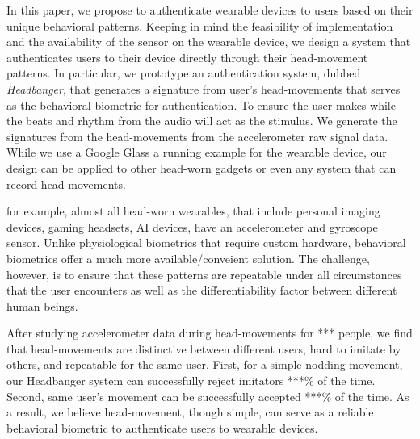 \vspace{1mm}
In this paper, we propose to authenticate wearable devices to users based on 
their unique behavioral patterns. Keeping in mind the feasibility of 
implementation and the availability of the sensor on the wearable device, 
we design a system that authenticates users to their device directly through 
their head-movement patterns.
In particular, we prototype an authentication system, dubbed {\em Headbanger},
that generates a signature from user's head-movements that serves as the 
behavioral biometric for authentication. To ensure the user makes while the 
beats and 
rhythm from the 
audio will 
act as the
stimulus. We generate the signatures from the head-movements from the
accelerometer raw signal data. While we use a Google Glass a running example
for the wearable device, our design can be applied to other head-worn gadgets
or even any system that can record head-movements.

for example, almost all head-worn wearables, that include personal imaging 
devices, gaming headsets, AI devices, have an accelerometer and gyroscope
sensor. Unlike physiological biometrics that require custom hardware,
behavioral biometrics offer a much more available/conveient solution. The challenge, however,
is to ensure that these patterns are repeatable under all circumstances that
the user encounters as well as the differentiability factor between different
human beings. %

After studying accelerometer data during head-movements for *** people, we 
find that head-movements are distinctive between different users, hard to 
imitate by others, and repeatable for the same user. First, for a simple 
nodding movement, our Headbanger system can successfully reject imitators 
***\% of the time. Second, same user's movement can be successfully accepted 
***\% of the time. As a result, we believe head-movement, though simple, can 
serve as a reliable behavioral biometric to authenticate users to wearable 
devices. 


